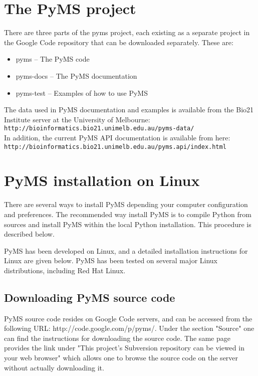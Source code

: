 \section{The PyMS project}

There are three parts of the pyms project, each existing as a separate
project in the Google Code repository that can be downloaded separately.
These are:

\begin{itemize}
  \item pyms -- The PyMS code
  \item pyms-docs -- The PyMS documentation
  \item pyms-test -- Examples of how to use PyMS
\end{itemize}

The data used in PyMS documentation and examples is available from the
Bio21 Institute server at the University of Melbourne:\\
{\tt http://bioinformatics.bio21.unimelb.edu.au/pyms-data/}\\
In addition, the current PyMS API documentation is available from here:\\
{\tt http://bioinformatics.bio21.unimelb.edu.au/pyms.api/index.html}

\section{PyMS installation on Linux}

There are several ways to install PyMS depending your computer configuration
and preferences. The recommended way install PyMS is to compile Python
from sources and install PyMS within the local Python installation. This
procedure is described below.

PyMS has been developed on Linux, and a detailed installation instructions
for Linux are given below. PyMS has been tested on several major Linux
distributions, including Red Hat Linux.

\subsection{Downloading PyMS source code}

PyMS source code resides on Google Code servers, and can be accessed
from the following URL: http://code.google.com/p/pyms/. Under the
section "Source" one can find the instructions for downloading the
source code. The same page provides the link under "This project's
Subversion repository can be viewed in your web browser" which allows
one to browse the source code on the server without actually downloading
it.

